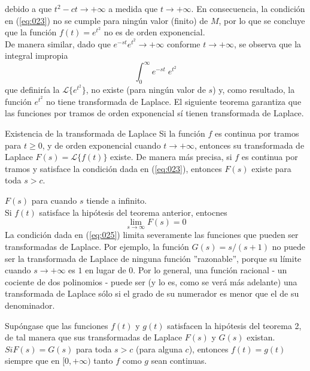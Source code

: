 debido a que $t^{2} - ct \to + \infty$ a medida que $t \to + \infty$. En consecuencia, la condición en (\ref{eq:023}) no se cumple para ningún valor (finito) de $M$, por lo que se concluye que la función $f(t) = e^{t^{2}}$ no es de orden exponencial.
\\
De manera similar, dado que $e^{-st}e^{t^{2}} \to + \infty$ conforme $t \to + \infty$, se observa que la integral impropia \[ \int_{0}^{\infty} e^{-st} \; e^{t^{2}}  \]
que definiría la $\mathscr{L} \{ e^{t^{2}} \}$, no existe (para ningún valor de $s$) y, como resultado, la función $e^{t^{2}}$ no tiene transformada de Laplace. El siguiente teorema garantiza que las funciones por tramos de orden exponencial sí tienen transformada de Laplace.
\begin{teo}{Existencia de la transformada de Laplace}
Si la función $f$ es continua por tramos para $t \geq 0$, y de orden exponencial cuando $t \to +\infty$, entonces su transformada de Laplace $F(s) = \mathscr{L} \{ f(t) \}$ existe. De manera más precisa, si $f$ es continua por tramos y satisface la condición dada en (\ref{eq:023}), entonces $F(s)$ existe para toda $s > c$.
\end{teo}
\begin{cor} {$F(s)$ para cuando $s$ tiende a infinito.}
\\
Si $f(t)$ satisface la hipótesis del teorema anterior, entocnes
\begin{equation}
\lim_{s \to \infty} F(s) = 0
\label{eq:025}
\end{equation}
La condición dada en (\ref{eq:025}) limita severamente las funciones que pueden ser transformadas de Laplace. Por ejemplo, la función $G(s) = s / (s + 1)$ no puede ser la transformada de Laplace de ninguna función ''razonable'', porque su límite cuando $s \to +\infty$ es $1$ en lugar de $0$. Por lo general, una función racional - un cociente de dos polinomios - puede ser (y lo es, como se verá más adelante) una transformada de Laplace sólo si el grado de su numerador es menor que el de su denominador.
\end{cor}
\begin{teo}
Supóngase que las funciones $f(t)$ y $g(t)$ satisfacen la hipótesis del teorema 2, de tal manera que sus transformadas de Laplace $F(s)$ y $G(s)$ existan. $Si F(s) = G(s)$ para toda $s > c$ (para alguna $c$), entonces $f(t) = g(t)$ siempre que en $[0, + \infty)$ tanto $f$ como $g$ sean continuas.
\end{teo}




